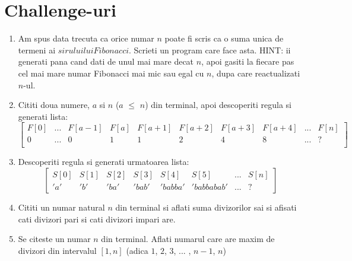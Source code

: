 \documentclass{article}
\begin{document}
\section{Challenge-uri}
    \begin{enumerate}
        \item Am spus data trecuta ca orice numar $n$ poate fi scris ca o suma unica de termeni ai $sirului lui Fibonacci$. Scrieti un program care face asta. HINT: ii generati pana cand dati de unul mai mare decat $n$, apoi gasiti la fiecare pas cel mai mare numar Fibonacci mai mic sau egal cu $n$, dupa care reactualizati $n$-ul.
        \item Cititi doua numere, $a$ si $n$ ($a$ $\leq$ $n$) din terminal, apoi descoperiti regula si generati lista:
            \[\begin{bmatrix}
                F[0] & ... & F[a-1] & F[a] & F[a+1] & F[a+2] & F[a+3] & F[a+4] & ... & F[n]\\
                0  & ... & 0 & 1 & 1 & 2 & 4 & 8 & ... & ?\\
              \end{bmatrix}\]
        \item Descoperiti regula si generati urmatoarea lista:
        \[\begin{bmatrix}
                S[0] & S[1] & S[2] & S[3] & S[4] & S[5] &  ... & S[n]\\
                'a' & 'b' & 'ba' & 'bab' & 'babba' & 'babbabab' & ... & ?
              \end{bmatrix}\]
        \item Cititi un numar natural $n$ din terminal si aflati suma divizorilor sai si afisati cati divizori pari si cati divizori impari are.
        \item Se citeste un numar $n$ din terminal. Aflati numarul care are maxim de divizori din intervalul $[1, n]$ (adica $1$, $2$, $3$, ... , $n-1$, $n$)

    \end{enumerate}
\end{document}

